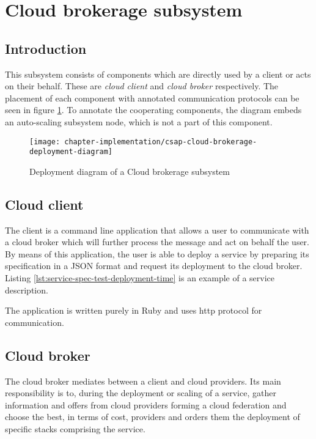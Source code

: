 \section{Cloud brokerage subsystem}
\subsection{Introduction}
This subsystem consists of components which are directly used by a client or acts on their behalf. These are \emph{cloud client} and \emph{cloud broker} respectively. The placement of each component with annotated communication protocols can be seen in figure \ref{fig:csap-cloud-brokerage-deployment-diagram}. To annotate the cooperating components, the diagram embeds an auto-scaling subsystem node, which is not a part of this component.

\begin{figure}[!ht]
  \begin{center}
    \texttt{[image: chapter-implementation/csap-cloud-brokerage-deployment-diagram]}
  \end{center}
  \caption{Deployment diagram of a Cloud brokerage subsystem}
  \label{fig:csap-cloud-brokerage-deployment-diagram}
\end{figure}

\subsection{Cloud client}
The client is a command line application that allows a user to communicate with a cloud broker which will further process the message and act on behalf the user. By means of this application, the user is able to deploy a service by preparing its specification in a JSON format and request its deployment to the cloud broker. Listing \ref{lst:service-spec-test-deployment-time} is an example of a service description.

The application is written purely in Ruby and uses http protocol for communication. 

\subsection{Cloud broker}
The cloud broker mediates between a client and cloud providers. Its main responsibility is to, during the deployment or scaling of a service, gather information and offers from cloud providers forming a cloud federation and choose the best, in terms of cost, providers and orders them the deployment of specific stacks comprising the service.

